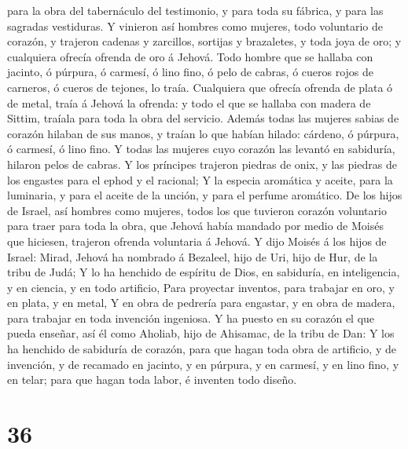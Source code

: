 para la obra del tabernáculo del testimonio, y para toda su fábrica, y
para las sagradas vestiduras.  Y vinieron así hombres como
mujeres, todo voluntario de corazón, y trajeron cadenas y zarcillos,
sortijas y brazaletes, y toda joya de oro; y cualquiera ofrecía ofrenda
de oro á Jehová.  Todo hombre que se hallaba con jacinto, ó
púrpura, ó carmesí, ó lino fino, ó pelo de cabras, ó cueros rojos de
carneros, ó cueros de tejones, lo traía.  Cualquiera que
ofrecía ofrenda de plata ó de metal, traía á Jehová la ofrenda: y todo
el que se hallaba con madera de Sittim, traíala para toda la obra del
servicio.  Además todas las mujeres sabias de corazón
hilaban de sus manos, y traían lo que habían hilado: cárdeno, ó púrpura,
ó carmesí, ó lino fino.  Y todas las mujeres cuyo corazón
las levantó en sabiduría, hilaron pelos de cabras.  Y los
príncipes trajeron piedras de onix, y las piedras de los engastes para
el ephod y el racional;  Y la especia aromática y aceite,
para la luminaria, y para el aceite de la unción, y para el perfume
aromático.  De los hijos de Israel, así hombres como
mujeres, todos los que tuvieron corazón voluntario para traer para toda
la obra, que Jehová había mandado por medio de Moisés que hiciesen,
trajeron ofrenda voluntaria á Jehová.  Y dijo Moisés á los
hijos de Israel: Mirad, Jehová ha nombrado á Bezaleel, hijo de Uri, hijo
de Hur, de la tribu de Judá;  Y lo ha henchido de espíritu
de Dios, en sabiduría, en inteligencia, y en ciencia, y en todo
artificio,  Para proyectar inventos, para trabajar en oro,
y en plata, y en metal,  Y en obra de pedrería para
engastar, y en obra de madera, para trabajar en toda invención
ingeniosa.  Y ha puesto en su corazón el que pueda enseñar,
así él como Aholiab, hijo de Ahisamac, de la tribu de Dan: 
Y los ha henchido de sabiduría de corazón, para que hagan toda obra de
artificio, y de invención, y de recamado en jacinto, y en púrpura, y en
carmesí, y en lino fino, y en telar; para que hagan toda labor, é
inventen todo diseño.

\hypertarget{section-35}{%
\section{36}\label{section-35}}

